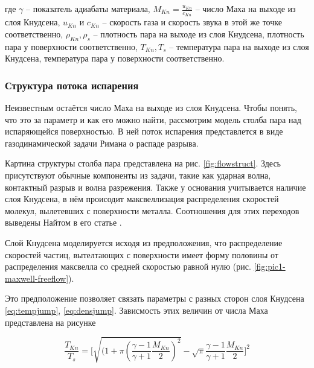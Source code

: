 \noindent
где $\gamma$ -- показатель адиабаты материала, $M_{Kn} = \frac{u_{Kn}}{c_{Kn}}$ -- число Маха на выходе из слоя Кнудсена, $u_{Kn}$ и $c_{Kn}$ -- скорость газа и скорость звука в этой же точке соответственно, $\rho_{Kn}, \rho_s$ -- плотность пара на выходе из слоя Кнудсена, плотность пара у поверхности соответственно, $ T_{Kn}, T_s$ -- температура пара на выходе из слоя Кнудсена, температура пара у поверхности соответственно.



\subsubsection{Структура потока испарения}

Неизвестным остаётся число Маха на выходе из слоя Кнудсена. Чтобы понять, что это за параметр и как его можно найти, рассмотрим модель столба пара над испаряющейся поверхностью. 
В ней поток испарения представлется в виде газодинамической задачи Римана о распаде разрыва.  

Картина структуры столба пара представлена на рис. \ref{fig:flowstruct}. Здесь присутствуют обычные компоненты из задачи, такие как ударная волна, контактный разрыв и волна разрежения. Также у основания учитывается наличие слоя Кнудсена, в нём происодит максвеллизация распределения скоростей молекул, вылетевших с поверхности металла. Соотношения для этих переходов выведены Найтом в его статье \cite{knight1979theoretical}.

Слой Кнудсена моделируется исходя из предположения, что распределение скоростей частиц, вытелтающих с поверхности имеет форму половины от распределения максвелла со средней скоростью равной нулю (рис. \ref{fig:pic1-maxwell-freeflow}).



Это предположение позволяет связать параметры с разных сторон слоя Кнудсена \cite{knight1979theoretical} \ref{eq:tempjump}, \ref{eq:densjump}. Зависмость этих величин от числа Маха представлена на рисунке

\begin{equation}
\label{eq:tempjump}
    \frac{T_{Kn}}{T_s} = \Bigg[ \sqrt{(1 + \pi \left( \frac{\gamma - 1}{\gamma + 1} \frac{M_{Kn}}{2} \right)^2} - \sqrt{\pi} \frac{\gamma - 1}{\gamma + 1} \frac{M_{Kn}}{2} \Bigg]^2
\end{equation}

